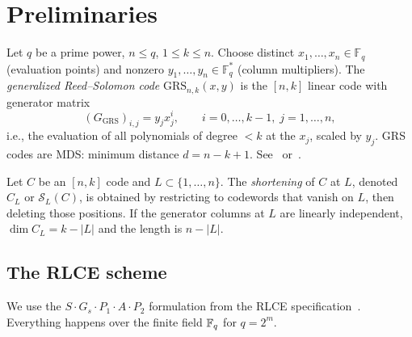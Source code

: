 \section{Preliminaries}

\begin{definition}
    Let $q$ be a prime power, $n \leq q$, $1 \leq k \leq n$. Choose distinct
    $x_1,\dots,x_n \in \mathbb{F}_q$ (evaluation points) and nonzero
    $y_1,\dots,y_n
        \in \mathbb{F}_q^*$ (column multipliers). The \emph{generalized
        Reed--Solomon
        code} $\mathrm{GRS}_{n,k}(x,y)$ is the $[n,k]$ linear code with
    generator
    matrix
    \[
        (G_{\mathrm{GRS}})_{i,j} = y_j x_j^i, \qquad i = 0,\dots,k-1,\; j =
        1,\dots,n,
    \]
    i.e., the evaluation of all polynomials of degree $< k$ at the $x_j$,
    scaled by
    $y_j$. GRS codes are MDS: minimum distance $d = n-k+1$.
    See~\cite[Ch.~10]{MS77}
    or~\cite[Ch.~5]{HP03}.
\end{definition}

\begin{definition}[Shortening]
    Let $C$ be an $[n,k]$ code and $L \subset \{1,\dots,n\}$. The
    \emph{shortening}
    of $C$ at $L$, denoted $C_L$ or $\mathcal{S}_L(C)$, is obtained by
    restricting to
    codewords that vanish on $L$, then deleting those positions. If the
    generator
    columns at $L$ are linearly independent, $\dim C_L = k - |L|$ and the
    length is
    $n - |L|$.
\end{definition}

\subsection{The RLCE scheme}

We use the $S \cdot G_s \cdot P_1 \cdot A \cdot P_2$ formulation from the RLCE
specification~\cite{Wan16,RLCE-spec}. Everything happens over the finite field $\mathbb{F}_q$ for 
$q=2^m$. 

